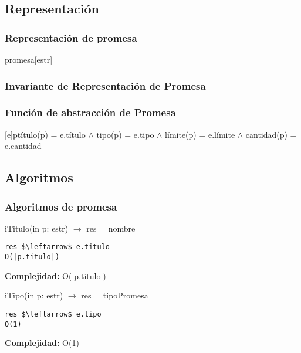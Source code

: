 \subsection{Representaci\'on}
\subsubsection{Representaci\'on de promesa}
\begin{Estructura}{promesa}[estr]
    \begin{Tupla}[estr]
    \end{Tupla}
\end{Estructura}

 \subsubsection{Invariante de Representaci\'on de Promesa}


\subsubsection{Funci\'on de abstracci\'on de Promesa}

[e]{p}{t\'itulo(p) = e.t\'itulo $\land$ tipo(p) = e.tipo $\land$ l\'imite(p) = e.l\'imite $\land$ cantidad(p) = e.cantidad}

  \subsection{Algoritmos}
\subsubsection{Algoritmos de promesa}

iTitulo(in p: estr) $\rightarrow$ res = nombre
\begin{lstlisting}[mathescape]
 res $\leftarrow$ e.titulo                                                         	O(|p.titulo|)
\end{lstlisting}
\textbf{Complejidad:} O(|p.titulo|)

iTipo(in p: estr) $\rightarrow$ res = tipoPromesa
\begin{lstlisting}[mathescape]
 res $\leftarrow$ e.tipo                                                                  O(1)
\end{lstlisting}
\textbf{Complejidad:} O(1)

